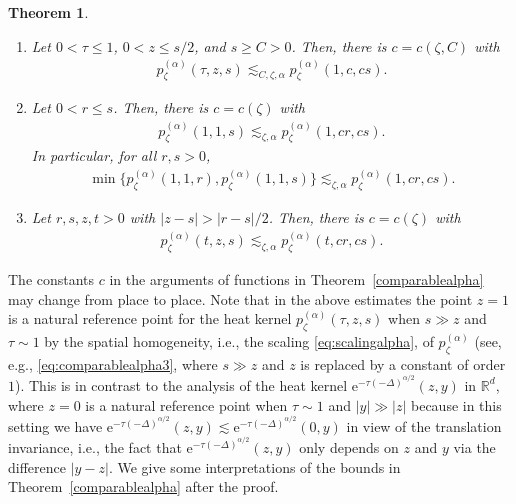 \documentclass[12pt,reqno,a4paper]{amsart}
\newtheorem{theorem}{Theorem}[section]
\theoremstyle{definition}
\theoremstyle{remark}
\numberwithin{equation}{section}
\newcommand{\1}{\mathbbm{1}}
\newcommand{\R}{\mathbb{R}}
\newcommand{\me}[1]{\mathrm{e}^{#1}}
\begin{document}
\begin{theorem}
\begin{enumerate}
  \item Let $0<\tau\leq1$, $0<z\leq s/2$, and $s\geq C>0$. Then, there is $c=c(\zeta,C)$ with
    \begin{align}
      \label{eq:comparablealpha3}
      p_\zeta^{(\alpha)}(\tau,z,s) \lesssim_{C,\zeta,\alpha} p_\zeta^{(\alpha)}(1,c,c s).
    \end{align}

  \item Let $0<r\leq s$. Then, there is $c=c(\zeta)$ with
    \begin{align}
      \label{eq:comparablealpha5}
      p_\zeta^{(\alpha)}(1,1,s) \lesssim_{\zeta,\alpha} p_\zeta^{(\alpha)}(1,c r,c s).
    \end{align}
    In particular, for all $r,s>0$,
    \begin{align}
      \label{eq:comparablealpha4}
      \min\{p_\zeta^{(\alpha)}(1,1,r),p_\zeta^{(\alpha)}(1,1,s)\}
      \lesssim_{\zeta,\alpha} p_\zeta^{(\alpha)}(1,c r,c s).
    \end{align}

  \item Let $r,s,z,t>0$ with $|z-s|>|r-s|/2$. Then, there is $c=c(\zeta)$ with
    \begin{align}
      \label{eq:comparablealpha6}
      p_\zeta^{(\alpha)}(t,z,s) \lesssim_{\zeta,\alpha} p_\zeta^{(\alpha)}(t,cr,cs).
    \end{align}
  \end{enumerate}
\end{theorem}

The constants $c$ in the arguments of functions in Theorem~\ref{comparablealpha} may change from place to place. Note that in the above estimates the point $z=1$ is a natural reference point for the heat kernel $p_\zeta^{(\alpha)}(\tau,z,s)$ when $s\gg z$ and $\tau\sim1$ by the spatial homogeneity, i.e., the scaling \eqref{eq:scalingalpha}, of $p_\zeta^{(\alpha)}$ (see, e.g., \eqref{eq:comparablealpha3}, where $s\gg z$ and $z$ is replaced by a constant of order $1$). This is in contrast to the analysis of the heat kernel $\me{-\tau(-\Delta)^{\alpha/2}}(z,y)$ in $\R^d$, where $z=0$ is a natural reference point when $\tau\sim1$ and $|y|\gg|z|$ because in this setting we have $\me{-\tau(-\Delta)^{\alpha/2}}(z,y) \lesssim \me{-\tau(-\Delta)^{\alpha/2}}(0,y)$ in view of the translation invariance, i.e., the fact that $\me{-\tau(-\Delta)^{\alpha/2}}(z,y)$ only depends on $z$ and $y$ via the difference $|y-z|$.
We give some interpretations of the bounds in Theorem~\ref{comparablealpha} after the proof.
\end{document}
